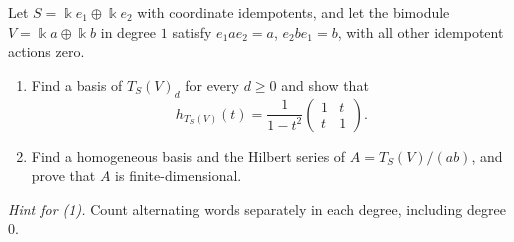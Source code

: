 \begin{exercise}
Let $S=\Bbbk e_1\oplus\Bbbk e_2$ with coordinate idempotents, and let the bimodule $V=\Bbbk a\oplus\Bbbk b$ in degree $1$ satisfy $e_1ae_2=a$, $e_2be_1=b$, with all other idempotent actions zero.
\begin{enumerate}
\item Find a basis of $T_S(V)_d$ for every $d\geq0$ and show that
\[
h_{T_S(V)}(t)=\frac{1}{1-t^2}\begin{pmatrix}1&t\\t&1\end{pmatrix}.
\]
\item Find a homogeneous basis and the Hilbert series of $A=T_S(V)/(ab)$, and prove that $A$ is finite-dimensional.
\end{enumerate}
\emph{Hint for (1).} Count alternating words separately in each degree, including degree $0$.
\end{exercise}

\pagebreak

